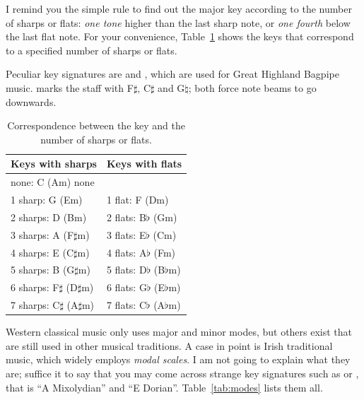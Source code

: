 \documentclass[a4paper,12pt]{book}
\begin{document}
I remind you the simple rule to find out the major key according to
the number of sharps or flats: \emph{one tone} higher than the last
sharp note, or \emph{one fourth} below the last flat note. For your
convenience, Table~\ref{tab:keys} shows the keys that correspond to a
specified number of sharps or flats.

Peculiar key signatures are  and , which are
used for Great Highland Bagpipe music.  marks the staff
with F$\sharp$, C$\sharp$ and G$\natural$; both force note beams to go
downwards.

\begin{table}[h]
\begin{center}
\begin{tabular}{ll}
\toprule %
\textbf{Keys with sharps} & \textbf{Keys with flats}\\
\midrule %
none: C (Am) none & \\
1 sharp: G (Em) & 1 flat: F (Dm) \\
2 sharps: D (Bm) & 2 flats: B$\flat$ (Gm) \\
3 sharps: A (F$\sharp$m) & 3 flats: E$\flat$ (Cm) \\
4 sharps: E (C$\sharp$m) & 4 flats: A$\flat$ (Fm) \\
5 sharps: B (G$\sharp$m) & 5 flats: D$\flat$ (B$\flat$m) \\
6 sharps: F$\sharp$ (D$\sharp$m) & 6 flats: G$\flat$ (E$\flat$m) \\
7 sharps: C$\sharp$ (A$\sharp$m) & 7 flats: C$\flat$ (A$\flat$m) \\
\bottomrule %
\end{tabular}
\caption{Correspondence between the key and the number of sharps or
flats.} \label{tab:keys}
\end{center}
\end{table}

Western classical music only uses major and minor modes, but others
exist that are still used in other musical traditions. A case in point
is Irish traditional music, which widely employs \emph{modal scales}.
I am not going to explain what they are; suffice it to say that you
may come across strange key signatures such as  or
, that is ``A Mixolydian'' and ``E Dorian''.
Table~\ref{tab:modes} lists them all.
\end{document}
